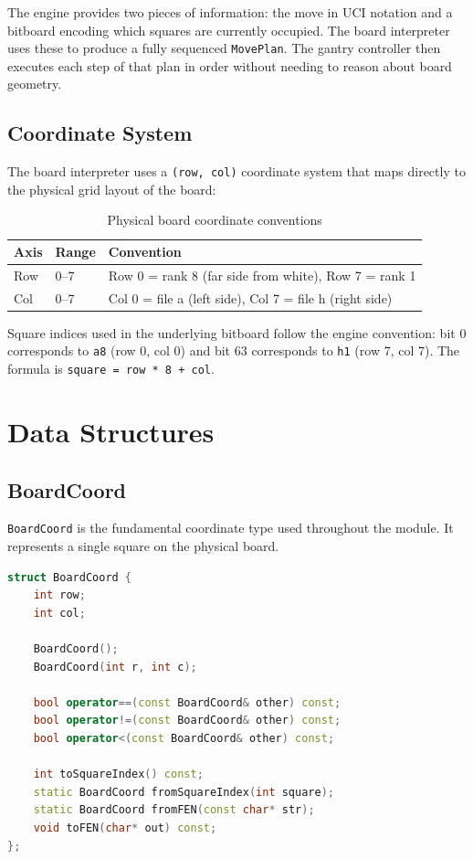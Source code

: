 \documentclass[11pt,a4paper]{report}
\begin{document}
The engine provides two pieces of information: the move in UCI notation and a bitboard encoding which squares are currently occupied. The board interpreter uses these to produce a fully sequenced \texttt{MovePlan}. The gantry controller then executes each step of that plan in order without needing to reason about board geometry.

\section{Coordinate System}

The board interpreter uses a \texttt{(row, col)} coordinate system that maps directly to the physical grid layout of the board:

\begin{table}[h]
\centering
\begin{tabular}{lll}
\toprule
\textbf{Axis} & \textbf{Range} & \textbf{Convention} \\
\midrule
Row & 0--7 & Row 0 = rank 8 (far side from white), Row 7 = rank 1 \\
Col & 0--7 & Col 0 = file a (left side), Col 7 = file h (right side) \\
\bottomrule
\end{tabular}
\caption{Physical board coordinate conventions}
\end{table}

Square indices used in the underlying bitboard follow the engine convention: bit 0 corresponds to \texttt{a8} (row 0, col 0) and bit 63 corresponds to \texttt{h1} (row 7, col 7). The formula is \texttt{square = row * 8 + col}.

\chapter{Data Structures}

\section{BoardCoord}

\texttt{BoardCoord} is the fundamental coordinate type used throughout the module. It represents a single square on the physical board.

\begin{lstlisting}[language=C++, caption={BoardCoord definition}]
struct BoardCoord {
    int row;
    int col;

    BoardCoord();
    BoardCoord(int r, int c);

    bool operator==(const BoardCoord& other) const;
    bool operator!=(const BoardCoord& other) const;
    bool operator<(const BoardCoord& other) const;

    int toSquareIndex() const;
    static BoardCoord fromSquareIndex(int square);
    static BoardCoord fromFEN(const char* str);
    void toFEN(char* out) const;
};
\end{lstlisting}
\end{document}
